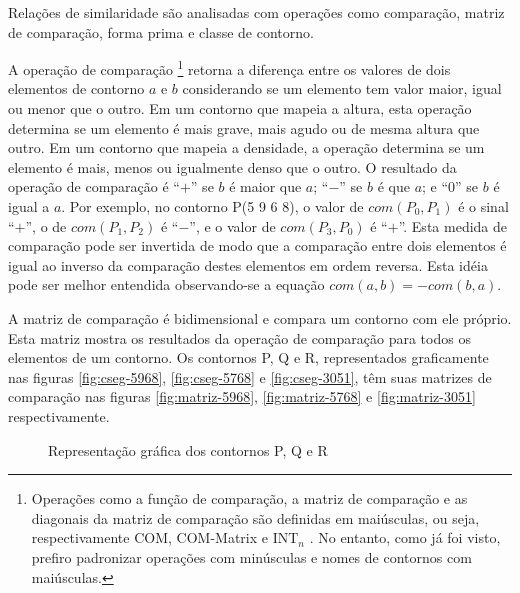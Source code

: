 Relações de similaridade \cite{marvin.ea87:relating} são analisadas
com operações como comparação, matriz de comparação, forma prima e
classe de contorno.

A operação de comparação \footnote{Operações como a
  função de comparação, a matriz de comparação e as diagonais da
  matriz de comparação são definidas em maiúsculas, ou seja,
  respectivamente COM, COM-Matrix e INT$_n$
  \cite{morris87:composition}. No entanto, como já foi visto, prefiro
  padronizar operações com minúsculas e nomes de contornos com
  maiúsculas.} retorna a diferença entre os valores de dois elementos
de contorno $a$ e $b$ considerando se um elemento tem valor maior,
igual ou menor que o outro. Em um contorno que mapeia a altura, esta
operação determina se um elemento é mais grave, mais agudo ou de mesma
altura que outro. Em um contorno que mapeia a densidade, a operação
determina se um elemento é mais, menos ou igualmente denso que o
outro. O resultado da operação de comparação é ``$+$'' se $b$ é maior
que $a$; ``$-$'' se $b$ é que $a$; e ``$0$'' se $b$ é igual a $a$. Por
exemplo, no contorno P(5 9 6 8), o valor de $com(P_0,P_1)$ é o sinal
``$+$'', o de $com(P_1,P_2)$ é ``$-$'', e o valor de $com(P_3,P_0)$ é
``$+$''. Esta medida de comparação pode ser invertida de modo que a
comparação entre dois elementos é igual ao inverso da comparação
destes elementos em ordem reversa. Esta idéia pode ser melhor
entendida observando-se a equação $com(a,b)=-com(b,a)$.

A matriz de comparação é bidimensional e compara um contorno com ele
próprio. Esta matriz mostra os resultados da operação de comparação
para todos os elementos de um contorno. Os contornos P, Q e R,
representados graficamente nas figuras \ref{fig:cseg-5968},
\ref{fig:cseg-5768} e \ref{fig:cseg-3051}, têm suas matrizes de
comparação nas figuras \ref{fig:matriz-5968}, \ref{fig:matriz-5768} e
\ref{fig:matriz-3051} respectivamente.

\begin{figure}
  \centering
  \subfloat[contorno P(5 9 6 8)]{
    \texttt{[image: c-5968]}
    \label{fig:cseg-5968}
  }
  \subfloat[contorno Q(5 7 6 8)]{
    \texttt{[image: c-5768]}
    \label{fig:cseg-5768}
  }
  \subfloat[contorno R(3 0 5 1)]{
    \texttt{[image: c-3051]}
    \label{fig:cseg-3051}
  }
  \caption{Representação gráfica dos contornos P, Q e R}
  \label{fig:repr-grafica-pqr}
\end{figure}

